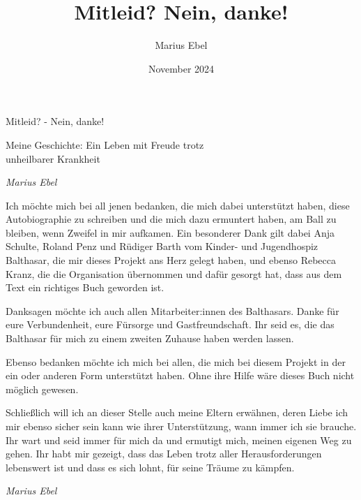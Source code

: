\documentclass[fontsize=14pt,a4paper,headinclude,DIV=calc,automark]{scrbook}
\title{Mitleid? Nein, danke!}
\author{Marius Ebel}
\date{November 2024}
\begin{document}
\frontmatter

\thispagestyle{empty}

\vspace*{\fill}
\begin{center}
    \huge\textcolor{myblue}{Mitleid? - Nein, danke!}\par
    \vspace{1cm}
    \large\textcolor{myblue}{ Meine Geschichte: Ein Leben mit Freude trotz \\ unheilbarer Krankheit}\par
    \vspace{1cm}
    \normalsize\textcolor{myblue}{\textit{Marius Ebel}}\par
\end{center}
\vspace*{\fill}

\tableofcontents

\pagestyle{plain}
\vspace{-1\baselineskip}

Ich möchte mich bei all jenen bedanken, die mich dabei unterstützt haben, diese Autobiographie zu schreiben und die mich dazu ermuntert haben, am Ball zu bleiben, wenn Zweifel in mir aufkamen.
Ein besonderer Dank gilt dabei Anja Schulte, Roland Penz und Rüdiger Barth vom Kinder- und Jugendhospiz Balthasar, die mir dieses Projekt ans Herz gelegt haben, und ebenso Rebecca Kranz, die die Organisation übernommen und dafür gesorgt hat, dass aus dem Text ein richtiges Buch geworden ist.

Danksagen möchte ich auch allen Mitarbeiter:innen des Balthasars. Danke für eure Verbundenheit, eure Fürsorge und Gastfreundschaft. Ihr seid es, die das Balthasar für mich zu einem zweiten Zuhause haben werden lassen.

Ebenso bedanken möchte ich mich bei allen, die mich bei diesem Projekt in der ein oder anderen Form unterstützt haben. Ohne ihre Hilfe wäre dieses Buch nicht möglich gewesen.

Schließlich will ich an dieser Stelle auch meine Eltern erwähnen, deren Liebe ich mir ebenso sicher sein kann wie ihrer Unterstützung, wann immer ich sie brauche. Ihr wart und seid immer für mich da und ermutigt mich, meinen eigenen Weg zu gehen. Ihr habt mir gezeigt, dass das Leben trotz aller Herausforderungen lebenswert ist und dass es sich lohnt, für seine Träume zu kämpfen.

\vspace{0.5cm}
\noindent\textit{Marius Ebel}
\end{document}
